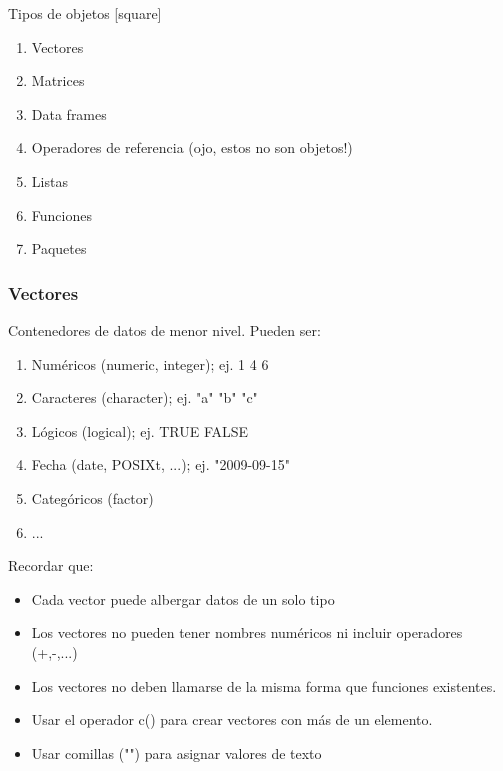\documentclass{beamer}
\begin{document}
\begin{frame}{Tipos de objetos}
 [square]
     \begin{enumerate}
      \item Vectores
	  \item Matrices
	  \item Data frames
	  \item Operadores de referencia (ojo, estos no son objetos!)
	  \item Listas
	  \item Funciones
	  \item Paquetes
      \end{enumerate}
  \end{frame}

 \begin{frame}
 \frametitle{Vectores}
Contenedores de datos de menor nivel. Pueden ser:
      \begin{enumerate}
 	    \item Num\'ericos (numeric, integer); ej. 1 4 6
	    \item Caracteres (character); ej. "a" "b" "c"
	    \item L\'ogicos (logical); ej. TRUE FALSE
	    \item Fecha (date, POSIXt, ...); ej. "2009-09-15"
	    \item Categ\'oricos (factor) 
	    \item ...
  	   \end{enumerate}
  	   Recordar que:
  	   \begin{itemize}
  	   \item Cada vector puede albergar datos de un solo tipo
  	   \item Los vectores no pueden tener nombres num\'ericos ni incluir operadores (+,-,...)
  	   \item Los vectores no deben llamarse de la misma forma que funciones existentes.
  	   \item Usar el operador c() para crear vectores  con m\'as de un elemento. 
  	   \item Usar comillas ("") para asignar valores de texto
  	   \end{itemize}
\end{frame}

\end{document}

